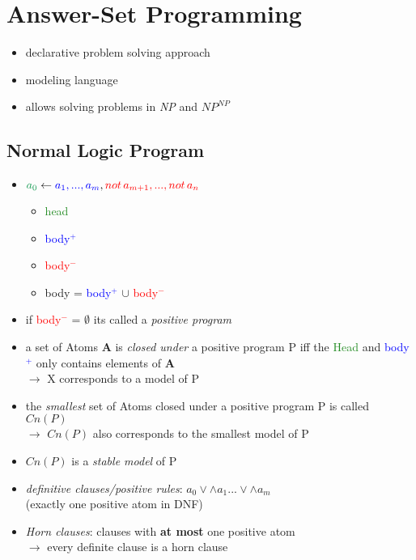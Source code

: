 \documentclass[12pt,a4paper]{article}
\newcommand{\red}[1]{\textcolor{red} {#1}}
\newcommand{\blue}[1]{\textcolor{blue} {#1}}
\newcommand{\green}[1]{\textcolor{ForestGreen} {#1}}
\begin{document}
\section{Answer-Set Programming}
\begin{itemize}
\item declarative problem solving approach
\item modeling language
\item allows solving problems in \textit{NP} and $\mathit{NP^{NP}}$
\end{itemize}

\subsection{Normal Logic Program}
\begin{itemize}
\item $\green{a_0} \leftarrow \blue{a_1,...,a_m},\red{not\, a_{m+1},...,not\, a_n}$
\begin{itemize}
\item \green{head}
\item \blue{body$^+$}
\item \red{body$^-$}
\item  body = \blue{body$^+$} $\cup$ \red{body$^-$}
\end{itemize}
\item if \red{body$^-$} = $\emptyset$ its called a \textit{positive program}
\item a set of Atoms \textbf{A} is \textit{closed under} a positive program P iff the \green{Head} and \blue{body$^+$} only contains elements of \textbf{A}\\
$\rightarrow$ X corresponds to a model of P
\item the \textit{smallest} set of Atoms closed under a positive program P is called $Cn(P)$\\
$\rightarrow$ $Cn(P)$ also corresponds to the smallest model of P
\item $Cn(P)$ is a \textit{stable model} of P
\item \textit{definitive clauses/positive rules}: $a_0 \lor\land a_1 ... \lor\land a_m$\\(exactly one positive atom in DNF)
\item \textit{Horn clauses}: clauses with \textbf{at most} one positive atom\\$\rightarrow$ every definite clause is a horn clause
\end{itemize}
\end{document}
